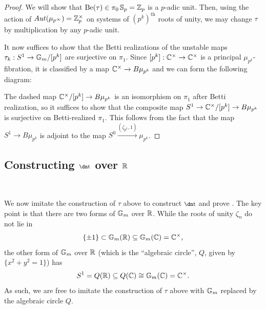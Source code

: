\begin{proof}
  We will show that $\mathrm{Be}(\tau) \in \pi_0 \operatorname{\mathbb{S}}_p = \mathbb{Z}_p$ is a $p$-adic unit.
  Then, using the action of $Aut(\mu_{p^\infty}) = \mathbb{Z}_p^\times$ on systems of $(p^k)^{\mathrm{th}}$ roots of unity, we may change $\tau$ by multiplication by any $p$-adic unit.

It now suffices to show that the Betti realizations of the unstable maps $\tau_k : S^1 \to \mathbb{G}_m / [p^k]$ are surjective on $\pi_1$. Since $[p^k] : \mathbb{C}^\times \to \mathbb{C}^\times$ is a principal $\mu_{p^k}$-fibration, it is classified by a map $\mathbb{C}^\times \to B\mu_{p^k}$ and we can form the following diagram:
\begin{center}
\end{center}

The dashed map $\mathbb{C}^\times / [p^k] \to B\mu_{p^k}$ is an isomorphism on $\pi_1$ after Betti realization, so it suffices to show that the composite map $S^1 \to \mathbb{C}^\times / [p^k] \to B\mu_{p^k}$ is surjective on Betti-realized $\pi_1$. This follows from the fact that the map $S^1 \to B\mu_{p^k}$ is adjoint to the map $S^0 \xrightarrow{(\zeta_{p^k},1)} \mu_{p^k}$.
\end{proof}

\subsection{Constructing $\ta$ over $\mathbb{R}$}\

We now imitate the construction of $\tau$ above to construct $\ta$ and prove .
The key point is that there are two forms of $\mathbb{G}_m$ over $\mathbb{R}$.
While the roots of unity $\zeta_n$ do not lie in
\[ \{\pm 1\} \subset \mathbb{G}_m (\mathbb{R}) \subseteq \mathbb{G}_m (\mathbb{C}) = \mathbb{C}^\times, \]
the other form of $\mathbb{G}_m$ over $\mathbb{R}$ (which is the ``algebraic circle'', $Q$, given by $\{x^2 + y^2 = 1\}$) has
\[ S^1 = Q(\mathbb{R}) \subseteq Q(\mathbb{C}) \cong \mathbb{G}_m (\mathbb{C}) = \mathbb{C}^\times. \]
As such, we are free to imitate the construction of $\tau$ above with $\mathbb{G}_m$ replaced by the algebraic circle $Q$.

